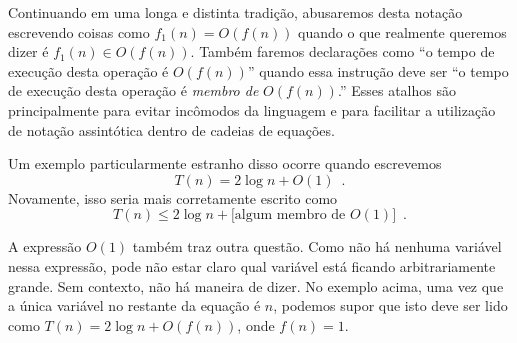 Continuando em uma longa e distinta tradição, abusaremos desta 
notação escrevendo coisas como $f_1(n) = O(f(n))$ quando o que realmente 
queremos dizer é $f_1(n) \in O(f(n))$. Também faremos declarações como ``o 
tempo de execução desta operação é $O(f(n))$'' quando essa instrução deve 
ser ``o tempo de execução desta operação é \emph{membro de} $O(f(n))$.'' 
Esses atalhos são principalmente para evitar incômodos da linguagem e 
para facilitar a utilização de notação assintótica dentro de cadeias de
equações.

Um exemplo particularmente estranho disso ocorre quando escrevemos
\[
T(n) = 2\log n + O(1)  \enspace .
\]
Novamente, isso seria mais corretamente escrito como
\[
T(n) \le 2\log n + [\mbox{algum membro de $O(1)$]}  \enspace .
\]

A expressão $O(1)$ também traz outra questão. Como não há nenhuma variável 
nessa expressão, pode não estar claro qual variável está ficando 
arbitrariamente grande. Sem contexto, não há maneira de dizer. 
No exemplo acima, uma vez que a única variável no restante da equação 
é $n$, podemos supor que isto deve ser lido como $T(n) = 2\log n + 
O(f(n))$, onde $f(n) = 1$.


